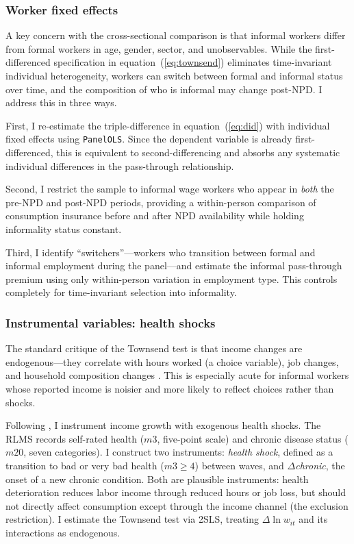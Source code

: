 \documentclass[12pt]{article}
\begin{document}
\subsubsection{Worker fixed effects}

A key concern with the cross-sectional comparison is that informal workers differ from formal workers in age, gender, sector, and unobservables. While the first-differenced specification in equation~(\ref{eq:townsend}) eliminates time-invariant individual heterogeneity, workers can switch between formal and informal status over time, and the composition of who is informal may change post-NPD. I address this in three ways.

First, I re-estimate the triple-difference in equation~(\ref{eq:did}) with individual fixed effects using \texttt{PanelOLS}. Since the dependent variable is already first-differenced, this is equivalent to second-differencing and absorbs any systematic individual differences in the pass-through relationship.

Second, I restrict the sample to informal wage workers who appear in \textit{both} the pre-NPD and post-NPD periods, providing a within-person comparison of consumption insurance before and after NPD availability while holding informality status constant.

Third, I identify ``switchers''---workers who transition between formal and informal employment during the panel---and estimate the informal pass-through premium using only within-person variation in employment type. This controls completely for time-invariant selection into informality.

\subsubsection{Instrumental variables: health shocks}

The standard critique of the Townsend test is that income changes are endogenous---they correlate with hours worked (a choice variable), job changes, and household composition changes \citep{Townsend1994, Gertler2002}. This is especially acute for informal workers whose reported income is noisier and more likely to reflect choices rather than shocks.

Following \citet{Gertler2002}, I instrument income growth with exogenous health shocks. The RLMS records self-rated health ($m3$, five-point scale) and chronic disease status ($m20$, seven categories). I construct two instruments: \textit{health shock}, defined as a transition to bad or very bad health ($m3 \geq 4$) between waves, and $\Delta$\textit{chronic}, the onset of a new chronic condition. Both are plausible instruments: health deterioration reduces labor income through reduced hours or job loss, but should not directly affect consumption except through the income channel (the exclusion restriction). I estimate the Townsend test via 2SLS, treating $\Delta \ln w_{it}$ and its interactions as endogenous.
\end{document}
